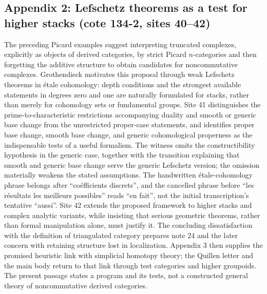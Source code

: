 \documentclass[10pt,oneside]{book}
\begin{document}
\subsection*{Appendix 2: Lefschetz theorems as a test for higher stacks (cote 134-2, sites 40--42)}
The preceding Picard examples suggest interpreting truncated complexes, explicitly as objects of derived categories, by strict Picard $n$-categories and then forgetting the additive structure to obtain candidates for noncommutative complexes. Grothendieck motivates this proposal through weak Lefschetz theorems in étale cohomology: depth conditions and the strongest available statements in degrees zero and one are naturally formulated for stacks, rather than merely for cohomology sets or fundamental groups. Site 41 distinguishes the prime-to-characteristic restrictions accompanying duality and smooth or generic base change from the unrestricted proper-case statements, and identifies proper base change, smooth base change, and generic cohomological properness as the indispensable tests of a useful formalism. The witness omits the constructibility hypothesis in the generic case, together with the transition explaining that smooth and generic base change serve the generic Lefschetz version; the omission materially weakens the stated assumptions. The handwritten étale-cohomology phrase belongs after ``coéfficients discrets'', and the cancelled phrase before ``les résultats les meilleurs possibles'' reads ``en fait'', not the initial transcription's tentative ``aussi''. Site 42 extends the proposed framework to higher stacks and complex analytic variants, while insisting that serious geometric theorems, rather than formal manipulation alone, must justify it. The concluding dissatisfaction with the definition of triangulated category prepares note 24 and the later concern with retaining structure lost in localization. Appendix 3 then supplies the promised heuristic link with simplicial homotopy theory; the Quillen letter and the main body return to that link through test categories and higher groupoids. The present passage states a program and its tests, not a constructed general theory of noncommutative derived categories.
\end{document}
